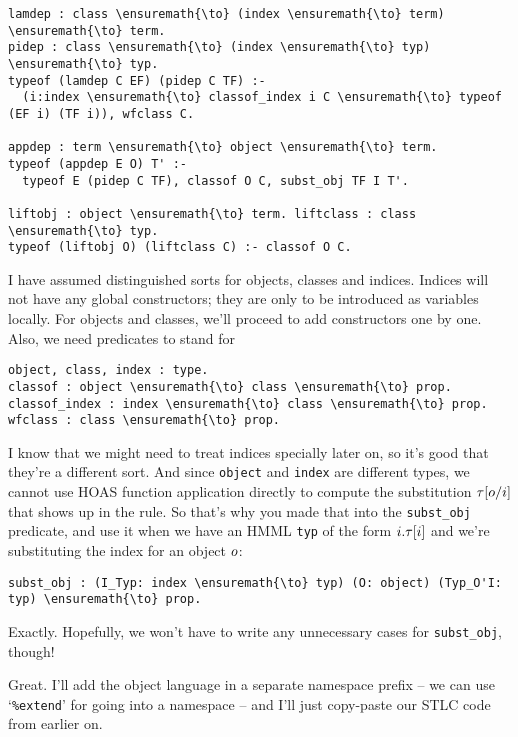 \begin{verbatim}
lamdep : class \ensuremath{\to} (index \ensuremath{\to} term) \ensuremath{\to} term.
pidep : class \ensuremath{\to} (index \ensuremath{\to} typ) \ensuremath{\to} typ.
typeof (lamdep C EF) (pidep C TF) :-
  (i:index \ensuremath{\to} classof_index i C \ensuremath{\to} typeof (EF i) (TF i)), wfclass C.

appdep : term \ensuremath{\to} object \ensuremath{\to} term.
typeof (appdep E O) T' :-
  typeof E (pidep C TF), classof O C, subst_obj TF I T'.

liftobj : object \ensuremath{\to} term. liftclass : class \ensuremath{\to} typ.
typeof (liftobj O) (liftclass C) :- classof O C.
\end{verbatim}

I have assumed distinguished sorts for objects, classes and indices.
Indices will not have any global constructors; they are only to be
introduced as variables locally. For objects and classes, we'll proceed
to add constructors one by one. Also, we need predicates to stand for

\begin{verbatim}
object, class, index : type.
classof : object \ensuremath{\to} class \ensuremath{\to} prop.
classof_index : index \ensuremath{\to} class \ensuremath{\to} prop.
wfclass : class \ensuremath{\to} prop.
\end{verbatim}

\heroADVISOR{} I know that we might need to treat indices specially later on,
so it's good that they're a different sort. And since \texttt{object}
and \texttt{index} are different types, we cannot use HOAS function
application directly to compute the substitution
\(\tau[o/i]\) that shows up in the 
rule. So that's why you made that into the \texttt{subst\_obj}
predicate, and use it when we have an HMML \texttt{typ} of the form
\(i.\tau[i]\) and we're substituting the index for an object
\(o\):

\begin{verbatim}
subst_obj : (I_Typ: index \ensuremath{\to} typ) (O: object) (Typ_O'I: typ) \ensuremath{\to} prop.
\end{verbatim}

\heroSTUDENT{} Exactly. Hopefully, we won't have to write any unnecessary
cases for \texttt{subst\_obj}, though!

\heroADVISOR{} Great. I'll add the object language in a separate namespace
prefix -- we can use `\texttt{\%extend}' for going into a namespace --
and I'll just copy-paste our STLC code from earlier on.


